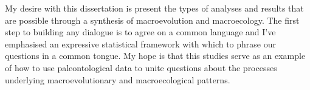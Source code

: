 My desire with this dissertation is present the types of analyses and results that are possible through a synthesis of macroevolution and macroecology. The first step to building any dialogue is to agree on a common language and I've emphasised an expressive statistical framework with which to phrase our questions in a common tongue. My hope is that this studies serve as an example of how to use paleontological data to unite questions about the processes underlying macroevolutionary and macroecological patterns.
